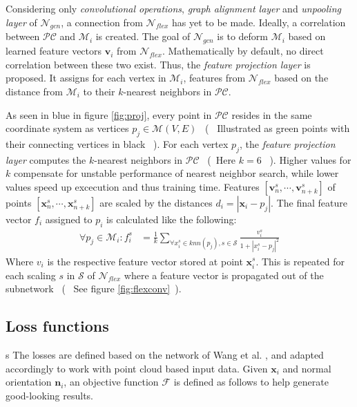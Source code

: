    Considering only \emph{convolutional operations}, \emph{graph alignment layer} and \emph{unpooling layer}
   of $\mathcal{N}_{gcn}$, a connection from $\mathcal{N}_{flex}$ has yet to be made. Ideally, a 
   correlation between $\mathcal{PC}$ and $\mathcal{M}_{i}$ is created. The goal of $\mathcal{N}_{gcn}$ is 
   to deform $\mathcal{M}_{i}$ based on learned feature vectors $\textbf{v}_i$ from $\mathcal{N}_{flex}$. 
   Mathematically by default, no direct correlation between these two exist. Thus, the 
   \emph{feature projection layer} is proposed. It assigns for each vertex in $\mathcal{M}_i$,
   features from $\mathcal{N}_{flex}$ based on the distance from $\mathcal{M}_{i}$ to their $k$-nearest 
   neighbors in $\mathcal{PC}$. 

   As seen in blue in figure \ref{fig:proj}, every point in $\mathcal{PC}$ resides in the same coordinate
   system as vertices $p_j \in \mathcal{M}(V,E)$ ~(~ Illustrated as green points with their connecting vertices in black ~).
   For each vertex $p_j$, the \emph{feature projection layer} computes the $k$-nearest neighbors in $\mathcal{PC}$ 
   ~(~Here $k=6$ ~). Higher values for $k$ compensate for unstable performance of nearest neighbor search, 
   while lower values speed up excecution and thus training time.
   Features $[\textbf{v}_n^s,\cdots,\textbf{v}_{n+k}^s]$ of points $[\textbf{x}_{n}^s,\cdots,\textbf{x}_{n+k}^s]$ are scaled by 
   the distances $d_i = |\textbf{x}_i  - p_j|$.
   The final feature vector $f_i$ assigned to $p_i$ is calculated like the following:
   \begin{align}
      \forall p_j \in \mathcal{M}_{i} : f_i^s &= \frac{1}{k}\sum_{\forall x_i^s \in knn(p_j),s\in \mathcal{S}} \frac{v_i^s}{1 + |x_i^s-p_j|^2}
   \end{align}
   Where $v_i$ is the respective feature vector stored at point $\textbf{x}_i^s$. This is repeated for each scaling $s$ in $\mathcal{S}$ of 
   $\mathcal{N}_{flex}$ where a feature vector is propagated out of the subnetwork ~(~ See figure \ref{fig:flexconv}~).

\subsection{Loss functions}
\label{lossfuncs}s
   The losses are defined based on the network of Wang et al. \cite{wang2018pixel2mesh}, 
   and adapted accordingly to work with point cloud based input data. Given $\textbf{x}_i$ 
   and normal orientation $\textbf{n}_i$, an objective function $\mathcal{F}$ is defined as 
   follows to help generate good-looking results.

